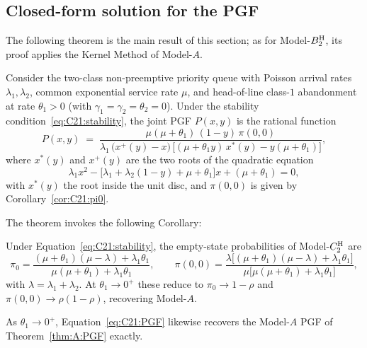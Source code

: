 \subsection{Closed-form solution for the PGF}

The following theorem is the main result of this section; as for Model-$B_2^{\mathrm{H}}$, its proof applies the Kernel Method of Model-$A$.

\begin{theorem}\label{thm:C21:PGF}
    Consider the two-class non-preemptive priority queue with Poisson arrival rates
    $\lambda_1,\lambda_2$, common exponential service rate $\mu$, and head-of-line class-$1$
    abandonment at rate $\theta_1>0$ (with $\gamma_1=\gamma_2=\theta_2=0$). Under the stability
    condition~\eqref{eq:C21:stability}, the joint PGF $P(x,y)$ is the
    rational function
    \begin{equation}
        P(x,y) \;=\;
        \frac{\mu(\mu+\theta_1)\,(1-y)\,\pi(0,0)}
        {\lambda_1\,\bigl(x^+(y)-x\bigr)
         \,\bigl[(\mu+\theta_1 y)\,x^*(y)-y(\mu+\theta_1)\bigr]},
        \label{eq:C21:PGF}
    \end{equation}
    where $x^*(y)$ and $x^+(y)$ are the two roots of the quadratic equation
    \begin{equation}
        \lambda_1 x^2 - \bigl[\lambda_1+\lambda_2(1-y)+\mu+\theta_1\bigr]x + (\mu+\theta_1) = 0,
        \label{eq:C21:quad}
    \end{equation}
    with $x^*(y)$ the root inside the unit disc, and $\pi(0,0)$ is given by
    Corollary~\ref{cor:C21:pi0}.
\end{theorem}
The theorem invokes the following Corollary:
\begin{corollary}\label{cor:C21:pi0}
    Under Equation~\eqref{eq:C21:stability}, the empty-state probabilities of Model-$C_2^{\mathrm{H}}$ are
    \begin{equation}
        \pi_0 = \frac{(\mu+\theta_1)(\mu-\lambda)+\lambda_1\theta_1}
                     {\mu(\mu+\theta_1)+\lambda_1\theta_1},
        \qquad
        \pi(0,0) = \frac{\lambda\bigl[(\mu+\theta_1)(\mu-\lambda)+\lambda_1\theta_1\bigr]}
                        {\mu\bigl[\mu(\mu+\theta_1)+\lambda_1\theta_1\bigr]},
        \label{eq:C21:pi0_pi00}
    \end{equation}
    with $\lambda=\lambda_1+\lambda_2$. At $\theta_1\to0^+$ these reduce to $\pi_0\to1-\rho$ and
    $\pi(0,0)\to\rho(1-\rho)$, recovering Model-$A$.
\end{corollary}

As $\theta_1\to0^+$, Equation~\eqref{eq:C21:PGF} likewise recovers the Model-$A$ PGF of Theorem~\ref{thm:A:PGF} exactly.


